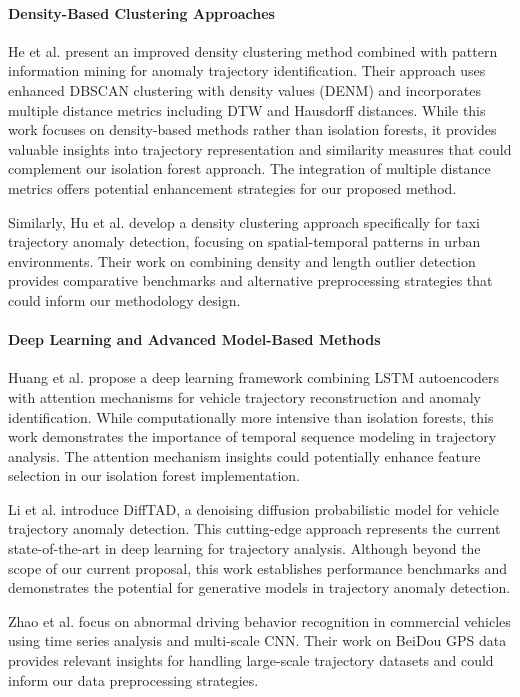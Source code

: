\documentclass[runningheads]{llncs}
\begin{document}
\paragraph{Density-Based Clustering Approaches}
He et al. \cite{he2019based} present an improved density clustering method combined with pattern information mining for anomaly trajectory identification. Their approach uses enhanced DBSCAN clustering with density values (DENM) and incorporates multiple distance metrics including DTW and Hausdorff distances. While this work focuses on density-based methods rather than isolation forests, it provides valuable insights into trajectory representation and similarity measures that could complement our isolation forest approach. The integration of multiple distance metrics offers potential enhancement strategies for our proposed method.

Similarly, Hu et al. \cite{hu2019based} develop a density clustering approach specifically for taxi trajectory anomaly detection, focusing on spatial-temporal patterns in urban environments. Their work on combining density and length outlier detection provides comparative benchmarks and alternative preprocessing strategies that could inform our methodology design.

\paragraph{Deep Learning and Advanced Model-Based Methods}
Huang et al. \cite{huang2021vehicle} propose a deep learning framework combining LSTM autoencoders with attention mechanisms for vehicle trajectory reconstruction and anomaly identification. While computationally more intensive than isolation forests, this work demonstrates the importance of temporal sequence modeling in trajectory analysis. The attention mechanism insights could potentially enhance feature selection in our isolation forest implementation.

Li et al. \cite{LI2024111387} introduce DiffTAD, a denoising diffusion probabilistic model for vehicle trajectory anomaly detection. This cutting-edge approach represents the current state-of-the-art in deep learning for trajectory analysis. Although beyond the scope of our current proposal, this work establishes performance benchmarks and demonstrates the potential for generative models in trajectory anomaly detection.

Zhao et al. \cite{zhao2021research} focus on abnormal driving behavior recognition in commercial vehicles using time series analysis and multi-scale CNN. Their work on BeiDou GPS data provides relevant insights for handling large-scale trajectory datasets and could inform our data preprocessing strategies.
\end{document}
